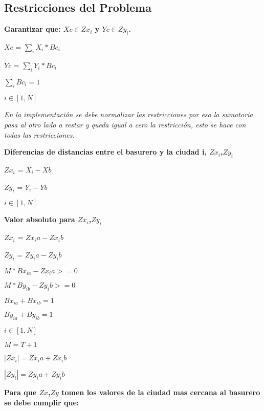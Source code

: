 \documentclass[10pt]{article}
\begin{document}
\subsection{Restricciones del Problema}
\textbf{Garantizar que:  $Xc \in Zx_i$ y $Yc \in Zy_i$. }\\

\begin{center}
$Xc$ = $\sum_i X_i * Bc_i$

$Yc$ = $\sum_i Y_i * Bc_i$

$\sum_i Bc_i = 1$

$i \in [1,N]$

 \emph{En la implementación se debe normalizar las restricciones por eso la sumatoria pasa al otro lado a restar y queda igual a cero la restricci\'on, esto se hace con todas las restricciones.}

\end{center}

\newpage

\textbf{Diferencias de distancias entre el basurero y la ciudad i, $Zx_i$,$Zy_i$ }\\

\begin{center}

 $Zx_i$ = $X_i- Xb $ 
 
  $Zy_i$ = $Y_i-Yb$ 
  
  $i \in [1,N]$
\end{center}

\textbf{Valor absoluto para  $Zx_i$,$Zy_i$ }\\

\begin{center}

 $Zx_i$ = $Zx_ia  - Zx_ib$ 
 
  $Zy_i$ = $Zy_ia  - Zy_ib$ \medskip 
  
  $M*Bx_{ia} - Zx_ia >= 0$
  
  $M*By_{ib} - Zy_ib >= 0$\medskip 
  
  $ Bx_{ia} + Bx_{ib} = 1 $
  
  $ By_{ia} + By_{ib} = 1 $\medskip 
  
   $i \in [1,N]$
   
   $M=T+1$\bigskip
  
   $ |Zx_i|=Zx_ia  + Zx_ib $ 
   
   $ |Zy_i|=Zy_ia  +  Zy_ib $ 
\end{center}


\textbf{Para que  $Zx$,$Zy$  tomen los valores de la ciudad mas cercana al basurero se debe cumplir que: }\\
\end{document}
